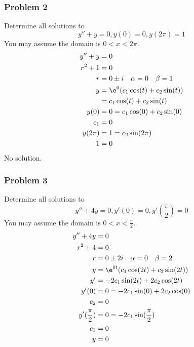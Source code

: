 \documentclass{math}
\begin{document}
\subsubsection*{Problem 2}
Determine all solutions to
\[ y''+y = 0, y(0) = 0, y(2\pi) = 1 \]
You may assume the domain is \( 0<x<2\pi \).
\begin{align*}
  y''+y &= 0 \\
  r^2+1 &= 0 \\
  r &= 0\pm i \quad \alpha = 0 \quad \beta = 1 \\
  y &= \e^{0}(c_1\cos(t)+c_2\sin(t)) \\
  &= c_1\cos(t)+c_2\sin(t) \\
  y(0) &= 0 = c_1\cos(0)+c_2\sin(0) \\
  c_1 &= 0 \\
  y(2\pi) &= 1 = c_2\sin(2\pi) \\
  1 &= 0
\end{align*}
No solution.

\subsubsection*{Problem 3}
Determine all solutions to
\[ y''+4y = 0, y'(0) = 0, y'(\frac{\pi}{2}) = 0 \]
You may assume the domain is \( 0<x<\frac{\pi}{2} \).
\begin{align*}
  y''+4y &= 0 \\
  r^2+4 &= 0 \\
  r &= 0\pm2i \quad \alpha = 0 \quad \beta = 2 \\
  y &= \e^{0t}(c_1\cos(2t)+c_2\sin(2t)) \\
  y' &= -2c_1\sin(2t)+2c_2\cos(2t) \\
  y'(0) &= 0 = -2c_1\sin(0)+2c_2\cos(0) \\
  c_2 &= 0 \\
  y'(\frac{\pi}{2}) &= 0 = -2c_1\sin(\frac{\pi}{2}) \\
  c_1 &= 0 \\
  y &= 0
\end{align*}
\end{document}
